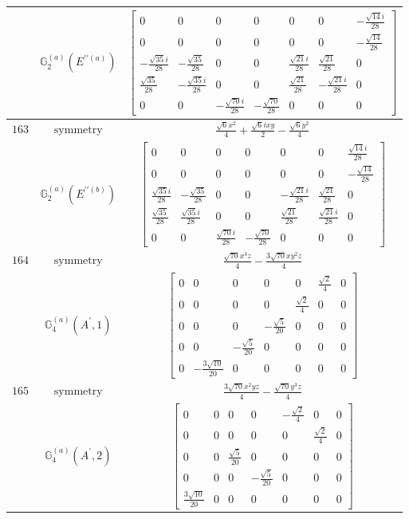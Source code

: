 \documentclass[fleqn,8pt,landscape]{jsarticle}
\begin{document}
\begin{longtable}{ccc}
$  $ & $ \mathbb{G}_{2}^{(a)}(E^{\prime\prime(a)}) $ & $ \begin{bmatrix} 0 & 0 & 0 & 0 & 0 & 0 & - \frac{\sqrt{14} i}{28} \\ 0 & 0 & 0 & 0 & 0 & 0 & - \frac{\sqrt{14}}{28} \\ - \frac{\sqrt{35} i}{28} & - \frac{\sqrt{35}}{28} & 0 & 0 & \frac{\sqrt{21} i}{28} & \frac{\sqrt{21}}{28} & 0 \\ \frac{\sqrt{35}}{28} & - \frac{\sqrt{35} i}{28} & 0 & 0 & \frac{\sqrt{21}}{28} & - \frac{\sqrt{21} i}{28} & 0 \\ 0 & 0 & - \frac{\sqrt{70} i}{28} & - \frac{\sqrt{70}}{28} & 0 & 0 & 0 \end{bmatrix} $ \\ \hline
$ 163 $ & $ \text{symmetry} $ & $ \frac{\sqrt{6} x^{2}}{4} + \frac{\sqrt{6} i x y}{2} - \frac{\sqrt{6} y^{2}}{4} $ \\
$  $ & $ \mathbb{G}_{2}^{(a)}(E^{\prime\prime(b)}) $ & $ \begin{bmatrix} 0 & 0 & 0 & 0 & 0 & 0 & \frac{\sqrt{14} i}{28} \\ 0 & 0 & 0 & 0 & 0 & 0 & - \frac{\sqrt{14}}{28} \\ \frac{\sqrt{35} i}{28} & - \frac{\sqrt{35}}{28} & 0 & 0 & - \frac{\sqrt{21} i}{28} & \frac{\sqrt{21}}{28} & 0 \\ \frac{\sqrt{35}}{28} & \frac{\sqrt{35} i}{28} & 0 & 0 & \frac{\sqrt{21}}{28} & \frac{\sqrt{21} i}{28} & 0 \\ 0 & 0 & \frac{\sqrt{70} i}{28} & - \frac{\sqrt{70}}{28} & 0 & 0 & 0 \end{bmatrix} $ \\ \hline
$ 164 $ & $ \text{symmetry} $ & $ \frac{\sqrt{70} x^{3} z}{4} - \frac{3 \sqrt{70} x y^{2} z}{4} $ \\
$  $ & $ \mathbb{G}_{4}^{(a)}(A^{\prime},1) $ & $ \begin{bmatrix} 0 & 0 & 0 & 0 & 0 & \frac{\sqrt{2}}{4} & 0 \\ 0 & 0 & 0 & 0 & \frac{\sqrt{2}}{4} & 0 & 0 \\ 0 & 0 & 0 & - \frac{\sqrt{5}}{20} & 0 & 0 & 0 \\ 0 & 0 & - \frac{\sqrt{5}}{20} & 0 & 0 & 0 & 0 \\ 0 & - \frac{3 \sqrt{10}}{20} & 0 & 0 & 0 & 0 & 0 \end{bmatrix} $ \\ \hline
$ 165 $ & $ \text{symmetry} $ & $ \frac{3 \sqrt{70} x^{2} y z}{4} - \frac{\sqrt{70} y^{3} z}{4} $ \\
$  $ & $ \mathbb{G}_{4}^{(a)}(A^{\prime},2) $ & $ \begin{bmatrix} 0 & 0 & 0 & 0 & - \frac{\sqrt{2}}{4} & 0 & 0 \\ 0 & 0 & 0 & 0 & 0 & \frac{\sqrt{2}}{4} & 0 \\ 0 & 0 & \frac{\sqrt{5}}{20} & 0 & 0 & 0 & 0 \\ 0 & 0 & 0 & - \frac{\sqrt{5}}{20} & 0 & 0 & 0 \\ \frac{3 \sqrt{10}}{20} & 0 & 0 & 0 & 0 & 0 & 0 \end{bmatrix} $ \\ \hline

\end{longtable}
\end{document}
